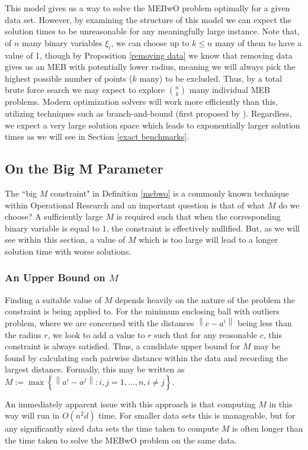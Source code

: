 \documentclass[11pt,twoside]{report}
\newcommand{\norm}[1]{\left\lVert#1\right\rVert} %
\theoremstyle{definition}
\numberwithin{theorem}{section}
\numberwithin{definition}{section}
\numberwithin{lemma}{section}
\numberwithin{proposition}{section}
\numberwithin{equation}{section}
\numberwithin{figure}{section}
\begin{document}
This model gives us a way to solve the MEBwO problem optimally for a given data set. However, by examining the structure of this model we can expect the solution times to be unreasonable for any meaningfully large instance. Note that, of $n$ many binary variables $\xi_i$, we can choose up to $k\leq n$ many of them to have a value of 1, though by Proposition \ref{removing data} we know that removing data gives us an MEB with potentially lower radius, meaning we will always pick the highest possible number of points ($k$ many) to be excluded. Thus, by a total brute force search we may expect to explore $\binom{n}{k}$ many individual MEB problems. Modern optimization solvers will work more efficiently than this, utilizing techniques such as branch-and-bound (first proposed by \cite{bnb}). Regardless, we expect a very large solution space which leads to exponentially larger solution times as we will see in Section \ref{exact benchmarks}.


\subsection{On the Big M Parameter}
The ``big $M$ constraint" in Definition \ref{mebwo} is a commonly known technique within Operational Research and an important question is that of what $M$ do we choose? A sufficiently large $M$ is required such that when the corresponding binary variable is equal to $1$, the constraint is effectively nullified. But, as we will see within this section, a value of $M$ which is too large will lead to a longer solution time with worse solutions.

\subsubsection{An Upper Bound on $M$}
Finding a suitable value of $M$ depends heavily on the nature of the problem the constraint is being applied to. For the minimum enclosing ball with outliers problem, where we are concerned with the distances $\norm{c-a^i}$ being less than the radius $r$, we look to add a value to $r$ such that for any reasonable $c$, this constraint is always satisfied. Thus, a candidate upper bound for $M$ may be found by calculating each pairwise distance within the data and recording the largest distance. Formally, this may be written as $M:= \max\left\{\norm{a^i-a^j}: i,j = 1,\ldots,n, i\neq j\right\}$.

An immediately apparent issue with this approach is that computing $M$ in this way will run in $O(n^2d)$ time. For smaller data sets this is manageable, but for any significantly sized data sets the time taken to compute $M$ is often longer than the time taken to solve the MEBwO problem on the same data.
\end{document}
